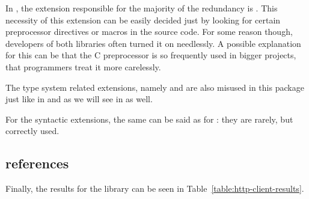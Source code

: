\documentclass[main.tex]{subfiles}
\begin{document}
	In , the extension responsible for the majority of the redundancy is . This necessity of this extension can be easily decided just by looking for certain preprocessor directives or macros in the source code. For some reason though, developers of both libraries often turned it on needlessly. A possible explanation for this can be that the C preprocessor is so frequently used in bigger projects, that programmers treat it more carelessly.
	
	The type system related extensions, namely  and  are also misused in this package just like in  and as we will see in  as well.
	
	For the syntactic extensions, the same can be said as for : they are rarely, but correctly used.
		
		
	
	\subsection{references}
	
	Finally, the results for the  library can be seen in Table~\ref{table:http-client-results}.
		
\end{document}
